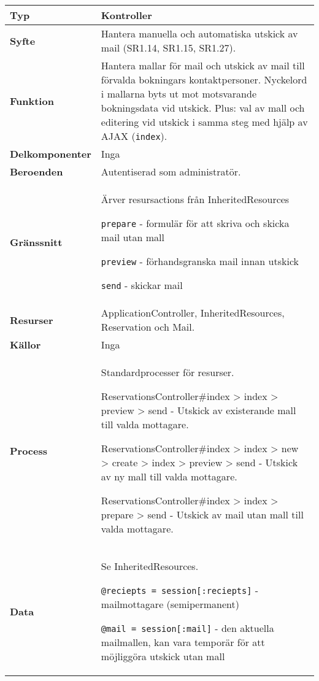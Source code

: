 \documentclass[a4paper, twoside, 11pt, titlepage]{article}
\begin{document}
			\begin {table} [ht] \begin{tabular} {  p{3.5cm} p{11.6cm} }
				\hline
				{\sffamily\textbf{Typ}} & {Kontroller} \\
				\hline
				{\sffamily\textbf{Syfte}} & {Hantera manuella och automatiska utskick av mail (SR1.14, SR1.15, SR1.27).} \\
				\hline
				{\sffamily\textbf{Funktion}} & {Hantera mallar för mail och utskick av mail till förvalda bokningars kontaktpersoner. Nyckelord i mallarna byts ut mot motsvarande bokningsdata vid utskick. Plus: val av mall och editering vid utskick i samma steg med hjälp av AJAX ({\tt index}).} \\
				\hline
				{\sffamily\textbf{Delkomponenter}} & {Inga} \\
				\hline
				{\sffamily\textbf{Beroenden}} & {Autentiserad som administratör.} \\
				\hline
				{\sffamily\textbf{Gränssnitt}} & {Ärver resursactions från InheritedResources

{\tt prepare} - formulär för att skriva och skicka mail utan mall

{\tt preview} - förhandsgranska mail innan utskick

{\tt send} - skickar mail} \\
				\hline
				{\sffamily\textbf{Resurser}} & {ApplicationController, InheritedResources, Reservation och Mail.} \\
				\hline
				{\sffamily\textbf{Källor}} & {Inga} \\
				\hline
				{\sffamily\textbf{Process}} & {Standardprocesser för resurser.

ReservationsController\#index > index > preview > send - Utskick av existerande mall till valda mottagare.

ReservationsController\#index > index > new > create > index > preview > send - Utskick av ny mall till valda mottagare.

ReservationsController\#index > index > prepare > send - Utskick av mail utan mall till valda mottagare.} \\
				\hline
				{\sffamily\textbf{Data}} & {Se InheritedResources.

{\tt @reciepts = session[:reciepts]} - mailmottagare (semipermanent)

{\tt @mail = session[:mail]} - den aktuella mailmallen, kan vara temporär för att möjliggöra utskick utan mall} \\
				\hline
			\end{tabular} \end{table} \FloatBarrier
\end{document}
